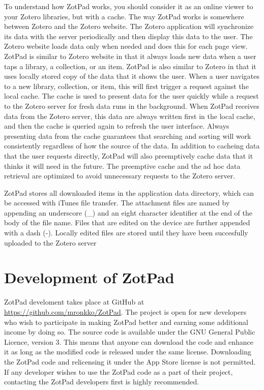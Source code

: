 \documentclass[oneside, openany, 12pt]{tufte-book}
\begin{document}
To understand how ZotPad works, you should consider it as an online viewer to your Zotero libraries, but with a cache. The way ZotPad works is somewhere between Zotero and the Zotero website. The Zotero application will synchronize its data with the server periodically and then display this data to the user. The Zotero website loads data only when needed and does this for each page view. ZotPad is similar to Zotero website in that it always loads new data when a user taps a library, a collection, or an item. ZotPad is also similar to Zotero in that it uses locally stored copy of the data that it shows the user. When a user navigates to a new library, collection, or item, this will first trigger a request against the local cache. The cache is used to present data for the user quickly while a request to the Zotero server for fresh data runs in the background. When ZotPad receives data from the Zotero server, this data are always written first in the local cache, and then the cache is queried again to refresh the user interface. Always presenting data from the cache guarantees that searching and sorting will work consistently regardless of how the source of the data. In addition to cacheing data that the user requests directly, ZotPad will also preemptively cache data that it thinks it will need in the future. The preemptive cache and the ad hoc data retrieval are optimized to avoid unnecessary requests to the Zotero server. 

ZotPad stores all downloaded items in the application data directory, which can be accessed with iTunes file transfer. The attachment files are named by appending an underscore (\_) and an eight character identifier at the end of the body of the file name. Files that are edited on the device are further appended with a dash (-). Locally edited files are stored until they have been succesfully uploaded to the Zotero server

	\section{Development of ZotPad}
	
ZotPad develoment takes place at GitHub at \url{https://github.com/mronkko/ZotPad}. The project is open for new developers who wish to participate in making ZotPad better and earning some additional income by doing so. The source code is available under the GNU General Public Licence, version 3. This means that anyone can download the code and enhance it as long as the modified code is released under the same license. Downloading the ZotPad code and relicensing it under the App Store license is not permitted. If any developer wishes to use the ZotPad code as a part of their project, contacting the ZotPad developers first is highly recommended.
\end{document}
